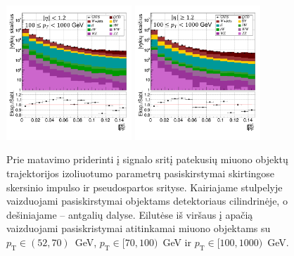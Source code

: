\documentclass[a4paper, 12pt, oneside]{article}
\newcommand{\pT}{p_{\mathrm{T}}}
\begin{document}
\vspace{-1cm}
\begin{figure}[H]
	\includegraphics[width=0.42\textwidth]{Magistrinis/TFIT_nume_barrel_100to1000.png}
	\includegraphics[width=0.42\textwidth]{Magistrinis/TFIT_nume_endcap_100to1000.png}
	\vspace{-0.7cm}
	\caption{\label{fig:tFit_signal}Prie matavimo priderinti į signalo sritį patekusių miuono objektų trajektorijos izoliuotumo
	parametrų pasiskirstymai skirtingose skersinio impulso ir pseudospartos srityse.
	Kairiajame stulpelyje vaizduojami pasiskirstymai objektams detektoriaus cilindrinėje, o dešiniajame -- antgalių dalyse.
	Eilutėse iš viršaus į apačią vaizduojami pasiskristymai atitinkamai miuono objektams su $\pT\!\in\!(52,70)$~GeV,
	$\pT\!\in\![70,100)$~GeV ir $\pT\!\in\![100,1000)$~GeV.}
\end{figure}
\end{document}
